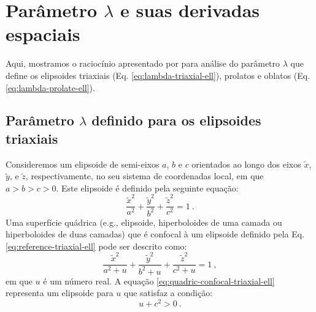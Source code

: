 \chapter{Parâmetro $\lambda$ e suas derivadas espaciais}

Aqui, mostramos o raciocínio apresentado por \citet{webster1904}
para análise do parâmetro $\lambda$ que define os elipsoides triaxiais (Eq. \ref{eq:lambda-triaxial-ell}), prolatos e oblatos (Eq. \ref{eq:lambda-prolate-ell}).

\section{Parâmetro $\lambda$ definido para os elipsoides triaxiais}

Consideremos um elipsoide de semi-eixos $a$, $b$ e $c$ orientados ao longo dos eixos
$\tilde{x}$, $\tilde{y}$, e $\tilde{z}$, respectivamente, no seu sistema de coordenadas
local, em que $a > b > c > 0$. Este elipsoide é definido pela seguinte equação:
\begin{equation}
\frac{\tilde{x}^{2}}{a^{2}} + \frac{\tilde{y}^{2}}{b^{2}} + \frac{\tilde{z}^{2}}{c^{2}} = 1 \: .
\label{eq:reference-triaxial-ell}
\end{equation}
Uma superfície quádrica (e.g., elipsoide, hiperboloides de uma camada ou 
hiperboloides de duas camadas) que é confocal à um elipsoide definido pela
Eq. \ref{eq:reference-triaxial-ell} pode ser descrito como:
\begin{equation}
\frac{\tilde{x}^{2}}{a^{2} + u} + \frac{\tilde{y}^{2}}{b^{2} + u} + \frac{\tilde{z}^{2}}{c^{2} + u} = 1 \: ,
\label{eq:quadric-confocal-triaxial-ell}
\end{equation}
em que $u$ é um número real. A equação \ref{eq:quadric-confocal-triaxial-ell}
representa um elipsoide para $u$ que satisfaz a condição:
\begin{equation}
u + c^{2} > 0 \: .
\label{eq:condition-triaxial-ell}
\end{equation}

